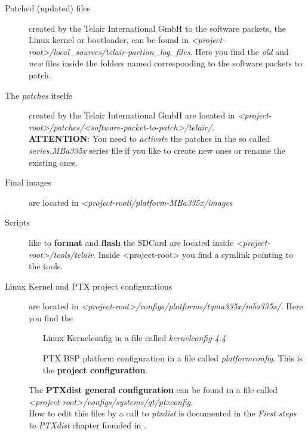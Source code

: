 \begin{description}
    \item[Patched (updated) files] created by the Telair International GmbH to
        the software packets, the Linux kernel or  bootloader, can be found in
        \newline \textit{<project-root>/local\_sources/telair-partion\_log\_files}.
        Here you find the \textit{old} and \textit{new} files inside the folders
        named corresponding to the software packets to patch.
    \item[The \textit{patches} itselfe] created by the Telair International GmbH
        are located in
        \textit{<project-root>/patches/<software-packet-to-patch>/telair/}. \\

        \textbf{ATTENTION}: You need to \textit{activate} the patches in
        the so called \textit{series.MBa335x} series file if you like to create
        new ones or rename the existing ones.

    \item[Final images] are located in
        \textit{<project-rootl/platform-MBa335x/images}

    \item[Scripts] like to \textbf{format} and \textbf{flash} the SDCard are
        located inside \newline \textit{<project-root>/tools/telair}. Inside
        <project-root> you find a symlink pointing to the tools.

    \item[Linux Kernel and PTX project configurations]are located in \newline
        \textit{<project-root>/configs/platforms/tqma335x/mba335x/}. Here you
        find the
        \begin{itemize}
            \item[Linux Kernelconfig] in a file called \textit{kernelconfig-4.4}
            \item[PTX BSP platform configuration] in a file called
                \textit{platformconfig}. This is the \textbf{project
                    configuration}.
        \end{itemize}

        The \textbf{PTXdist general configuration} can be found in a file called
        \newline \textit{<project-root>/configs/systems/qt/ptxconfig}.\\

         How to edit this files by a call to \textit{ptxdist} is documented in
         the \textit{First steps to PTXdist} chapter founded in \cite[PTXDist
         online documentation]{ptxdist_docu}.


\end{description}

